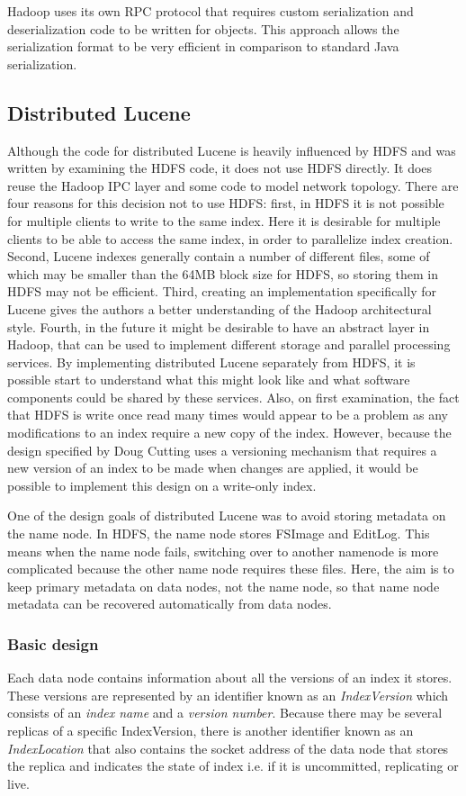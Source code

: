 \documentclass[a4paper,10pt]{article}
\begin{document}
Hadoop uses its own RPC protocol that requires custom serialization and deserialization code to be written for objects. This approach allows the serialization format to be very efficient in comparison to standard Java serialization. 

\subsection{Distributed Lucene}
Although the code for distributed Lucene is heavily influenced by HDFS and was written by examining the HDFS code, it does not use HDFS directly. It does reuse the Hadoop IPC layer and some code to model network topology. There are four reasons for this decision not to use HDFS: first, in HDFS it is not possible for multiple clients to write to the same index. Here it is desirable for multiple clients to be able to access the same index, in order to parallelize index creation. Second, Lucene indexes generally contain a number of different files, some of which may be smaller than the 64MB block size for HDFS, so storing them in HDFS may not be efficient. Third, creating an implementation specifically for Lucene gives the authors a better understanding of the Hadoop architectural style. Fourth, in the future it might be desirable to have an abstract layer in Hadoop, that can be used to implement different storage and parallel processing services. By implementing distributed Lucene separately from HDFS, it is possible start to understand what this might look like and what software components could be shared by these services. Also, on first examination, the fact that HDFS is write once read many times would appear to be a problem as any modifications to an index require a new copy of the index. However, because the design specified by Doug Cutting \cite{cutting2006} uses a versioning mechanism that requires a new version of an index to be made when changes are applied, it would be possible to implement this design on a write-only index. 

One of the design goals of distributed Lucene was to avoid storing metadata on the name node. In HDFS, the name node stores FSImage and EditLog. This means when the name node fails, switching over to another namenode is more complicated because the other name node requires these files. Here, the aim is to keep primary metadata on data nodes, not the name node, so that name node metadata can be recovered automatically from data nodes. 

\subsubsection{Basic design}
Each data node contains information about all the versions of an index it stores. These versions are represented by an identifier known as an \emph{IndexVersion} which consists of an \emph{index name} and a \emph{version number}. Because there may be several replicas of a specific IndexVersion, there is another identifier known as an \emph{IndexLocation} that also contains the socket address of the data node that stores the replica and indicates the state of index i.e. if it is uncommitted, replicating or live. 
\end{document}
